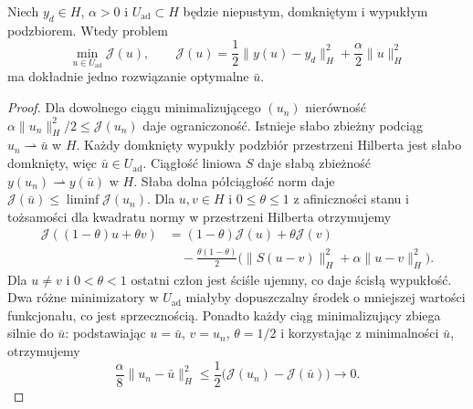 \begin{twierdzenie}\label{thm:pde32-control}
Niech $y_d\in H$, $\alpha>0$ i $U_{\mathrm{ad}}\subset H$
będzie niepustym, domkniętym i wypukłym podzbiorem.
Wtedy problem
\begin{equation}\label{eq:pde32-opt}
 \min_{u\in U_{\mathrm{ad}}}
 \mathcal J(u),\qquad
 \mathcal J(u)=\frac12\|y(u)-y_d\|_H^2
 +\frac\alpha2\|u\|_H^2
\end{equation}
ma dokładnie jedno rozwiązanie optymalne $\bar u$.
\end{twierdzenie}
\begin{proof}
Dla dowolnego ciągu minimalizującego $(u_n)$ nierówność
$\alpha\|u_n\|_H^2/2\le\mathcal J(u_n)$ daje ograniczoność.
Istnieje słabo zbieżny podciąg $u_n\rightharpoonup\bar u$ w $H$.
Każdy domknięty wypukły podzbiór przestrzeni Hilberta jest
słabo domknięty, więc $\bar u\in U_{\mathrm{ad}}$.
Ciągłość liniowa $S$ daje słabą zbieżność
$y(u_n)\rightharpoonup y(\bar u)$ w $H$.
Słaba dolna półciągłość norm daje
$\mathcal J(\bar u)\le\liminf\mathcal J(u_n)$.
Dla $u,v\in H$ i $0\le\theta\le1$ z afiniczności
stanu i tożsamości dla kwadratu normy w przestrzeni
Hilberta otrzymujemy
\[
 \begin{aligned}
 \mathcal J((1-\theta)u+\theta v)
 &=(1-\theta)\mathcal J(u)+\theta\mathcal J(v)\\
 &\quad-\frac{\theta(1-\theta)}2
 \bigl(\|S(u-v)\|_H^2+\alpha\|u-v\|_H^2\bigr).
 \end{aligned}
\]
Dla $u\ne v$ i $0<\theta<1$ ostatni człon jest
ściśle ujemny, co daje ścisłą wypukłość.
Dwa różne minimizatory w $U_{\mathrm{ad}}$
miałyby dopuszczalny środek o mniejszej wartości
funkcjonału, co jest sprzecznością.
Ponadto każdy ciąg minimalizujący zbiega silnie
do $\bar u$: podstawiając $u=\bar u$, $v=u_n$,
$\theta=1/2$ i korzystając z minimalności
$\bar u$, otrzymujemy
\[
 \frac{\alpha}{8}\|u_n-\bar u\|_H^2
 \le \frac12\bigl(\mathcal J(u_n)-\mathcal J(\bar u)\bigr)
 \longrightarrow0.
\]
\end{proof}

